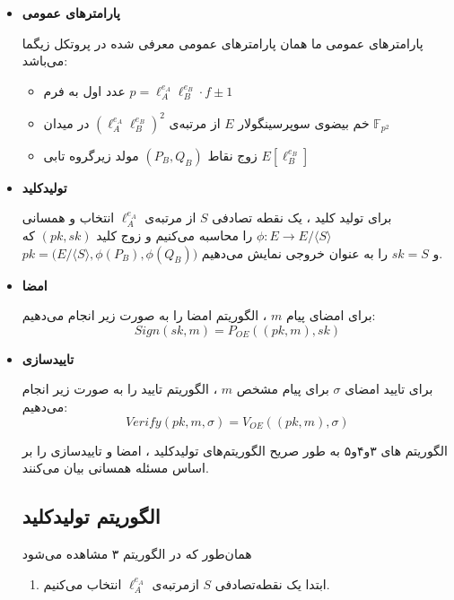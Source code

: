 \begin{itemize}
	\item[]{\bf پارامترهای عمومی }
	
	پارامترهای عمومی ما همان پارامترهای عمومی معرفی شده در پروتکل زیگما می‌باشد:
	\begin{itemize}
		\item {
		 عدد اول به فرم 
		$p = \ell_A^{e_A} \ell_B^{e_B} \cdot f \pm 1$
	}

		\item {
		 خم بیضوی سوپرسینگولار 
		$E$
		از مرتبه‌ی
		$(\ell_A^{e_A} \ell_B^{e_B})^2$
		در میدان 
		$\mathbb{F}_{p^2}$
	}

		\item {
		زوج نقاط 
		$(P_B,Q_B)$
		مولد زیرگروه تابی 
		$E[\ell_B^{e_B} ]$
	}
	\end{itemize}	 
	
	\item[]{\bf تولیدکلید}
	
	برای تولید کلید ، یک نقطه تصادفی
$S$
از مرتبه‌ی
$\ell_A^{e_A}$	
انتخاب و همسانی
\newline
$\phi : E \rightarrow E/ \langle S \rangle $
را محاسبه می‌کنیم و زوج کلید 
$(pk,sk)$
که  
\\
$pk = \Big(E/ \langle S \rangle , \phi (P_B) , \phi (Q_B) \Big)$
و
$ sk = S $
را به عنوان خروجی نمایش می‌دهیم.
\newline
\newline
\newline
\item[]{\bf امضا}

برای امضای پیام 
$m$
، الگوریتم امضا را به صورت زیر انجام می‌دهیم: 
$$ Sign(sk,m) = P_{OE}((pk,m),sk)$$

\item[]{\bf تاییدسازی}

برای تایید امضای
$\sigma$
برای پیام مشخص
$m$
، الگوریتم تایید را به صورت زیر انجام می‌دهیم:
$$ Verify(pk,m,\sigma) = V_{OE}((pk,m),\sigma) $$

الگوریتم های ۳و۴و۵ به طور صریح الگوریتم‌های تولیدکلید ، امضا و تاییدسازی را بر اساس مسئله همسانی  بیان می‌کنند.
\subsection{الگوریتم تولیدکلید}\label{algorithm_keygen}
همان‌طور که در الگوریتم ۳ مشاهده می‌شود
\begin{enumerate}
	\item {
	ابتدا یک نقطه‌تصادفی 
	$S$
	ازمرتبه‌ی
	$\ell_A^{e_A}$
	انتخاب می‌کنیم.
	}


\end{enumerate}
\end{itemize}
